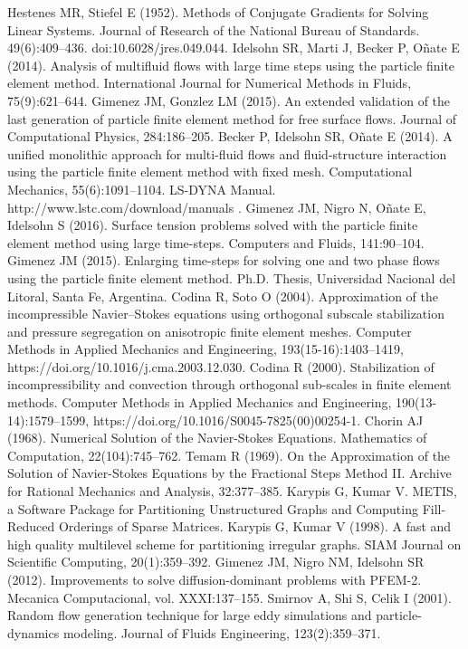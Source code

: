  Hestenes MR, Stiefel E (1952). Methods of Conjugate Gradients for Solving Linear Systems. Journal of Research of the National Bureau of Standards. 49(6):409--436. doi:10.6028/jres.049.044.
 Idelsohn SR, Marti J, Becker P, O\~nate E (2014). Analysis of multifluid flows with large time steps using the particle finite element method. International Journal for Numerical Methods in Fluids, 75(9):621--644.
 Gimenez JM, Gonzlez LM (2015). An extended validation of the last generation of particle finite element method for free surface flows. Journal of Computational Physics, 284:186--205.
 Becker P, Idelsohn SR, O\~nate E (2014). A unified monolithic approach for multi-fluid flows and fluid-structure interaction using the particle finite element method with fixed mesh. Computational Mechanics, 55(6):1091--1104.
 LS-DYNA Manual.\\
http://www.lstc.com/download/manuals .
 Gimenez JM, Nigro N, O\~nate E, Idelsohn S (2016). Surface tension problems solved with the particle finite element method using large time-steps. Computers and Fluids, 141:90--104.
 Gimenez JM (2015). Enlarging time-steps for solving one and two phase flows using the particle finite element method. Ph.D. Thesis, Universidad Nacional del Litoral, Santa Fe, Argentina.
 Codina R, Soto O (2004). Approximation of the incompressible Navier–Stokes equations using orthogonal subscale stabilization and pressure segregation on anisotropic finite element meshes. Computer Methods in Applied Mechanics and Engineering, 193(15-16):1403--1419, https://doi.org/10.1016/j.cma.2003.12.030.
 Codina R (2000). Stabilization of incompressibility and convection through orthogonal sub-scales in finite element methods. Computer Methods in Applied Mechanics and Engineering, 190(13-14):1579--1599, https://doi.org/10.1016/S0045-7825(00)00254-1.
 Chorin AJ (1968). Numerical Solution of the Navier-Stokes Equations. Mathematics of Computation, 22(104):745--762.
 Temam R (1969). On the Approximation of the Solution of Navier-Stokes Equations by the Fractional Steps Method II. Archive for Rational Mechanics and Analysis, 32:377--385.
 Karypis G, Kumar V. METIS, a Software Package for Partitioning Unstructured Graphs and Computing Fill-Reduced Orderings of Sparse Matrices.
 Karypis G, Kumar V (1998). A fast and high quality multilevel scheme for partitioning irregular graphs. SIAM Journal on Scientific Computing, 20(1):359--392.
 Gimenez JM, Nigro NM, Idelsohn SR (2012). Improvements to solve diffusion-dominant problems with PFEM-2. Mecanica Computacional, vol. XXXI:137--155.
 Smirnov A, Shi S, Celik I (2001). Random flow generation technique for large eddy simulations and particle-dynamics modeling. Journal of Fluids Engineering, 123(2):359--371.
